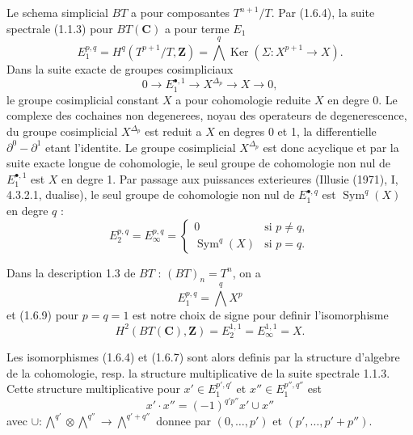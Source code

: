 \documentclass[11pt,a4paper]{article}
\theoremstyle{plain}
\theoremstyle{definition}
\DeclareMathOperator{\Sym}{Sym}
\DeclareMathOperator{\Ker}{Ker}
\begin{document}
Le schema simplicial $BT$ a pour composantes $T^{n+1}/T$. Par (1.6.4), la suite spectrale (1.1.3) pour $BT(\mathbf{C})$ a pour terme $E_1$
\begin{equation}\label{1.6.7}
E_1^{p,q} = H^q(T^{p+1}/T, \mathbf{Z}) = \bigwedge^q \Ker(\Sigma : X^{p+1} \to X).
\end{equation}
Dans la suite exacte de groupes cosimpliciaux
\[
0 \to E_1^{\bullet,1} \to X^{\Delta_p} \to X \to 0,
\]
le groupe cosimplicial constant $X$ a pour cohomologie reduite $X$ en degre 0. Le complexe des cochaines non degenerees, noyau des operateurs de degenerescence, du groupe cosimplicial $X^{\Delta_p}$ est reduit a $X$ en degres 0 et 1, la differentielle $\partial^0 - \partial^1$ etant l'identite. Le groupe cosimplicial $X^{\Delta_p}$ est donc acyclique et par la suite exacte longue de cohomologie, le seul groupe de cohomologie non nul de $E_1^{\bullet,1}$ est $X$ en degre 1. Par passage aux puissances exterieures (Illusie (1971), I, 4.3.2.1, dualise), le seul groupe de cohomologie non nul de $E_1^{\bullet,q}$ est $\Sym^q(X)$ en degre $q$ :
\begin{equation}\label{1.6.8}
E_2^{p,q} = E_\infty^{p,q} =
\begin{cases}
0 & \text{si } p \neq q, \\
\Sym^q(X) & \text{si } p = q.
\end{cases}
\end{equation}

Dans la description 1.3 de $BT$ : $(BT)_n = T^n$, on a
\begin{equation}\label{1.6.9}
E_1^{p,q} = \bigwedge^q X^p
\end{equation}
et (1.6.9) pour $p = q = 1$ est notre choix de signe pour definir l'isomorphisme
\begin{equation}\label{1.6.10}
H^2(BT(\mathbf{C}), \mathbf{Z}) = E_2^{1,1} = E_\infty^{1,1} = X.
\end{equation}

Les isomorphismes (1.6.4) et (1.6.7) sont alors definis par la structure d'algebre de la cohomologie, resp. la structure multiplicative de la suite spectrale 1.1.3. Cette structure multiplicative pour $x' \in E_1^{p',q'}$ et $x'' \in E_1^{p'',q''}$ est
\[
x' \cdot x'' = (-1)^{q'p''} x' \cup x''
\]
avec $\cup : \bigwedge^{q'} \otimes \bigwedge^{q''} \to \bigwedge^{q'+q''}$ donnee par $(0, \ldots, p')$ et $(p', \ldots, p'+p'')$.

\subsection{}\label{1.7}
\end{document}
